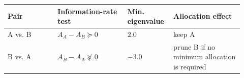 \begin{tabular}{p{0.20\linewidth}p{0.28\linewidth}p{0.16\linewidth}p{0.28\linewidth}}
\toprule
Pair & Information-rate test & Min. eigenvalue & Allocation effect \\
\midrule
A vs. B & $A_{A}-A_{B}\succeq 0$ & $2.0$ & keep A \\
B vs. A & $A_{B}-A_{A}\not\succeq 0$ & $-3.0$ & prune B if no minimum allocation is required \\
\bottomrule
\end{tabular}

